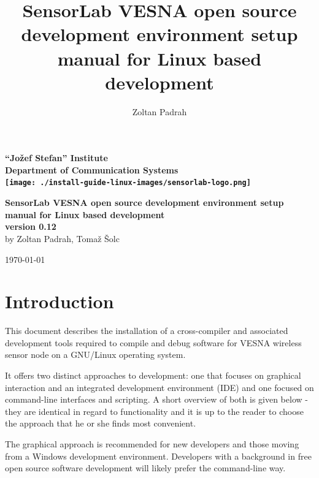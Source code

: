 \documentclass[a4paper, 10pt]{article}
\title{SensorLab VESNA open source development environment setup manual for Linux based development}
\author{Zoltan Padrah}
\begin{document}
\begin{titlepage}
    \begin{center}
    \textbf{
        \Large ``Jožef Stefan'' Institute \\[2mm]
        Department of Communication Systems\\[2mm]
        \texttt{[image: ./install-guide-linux-images/sensorlab-logo.png]}
        }\\

    \vfill

    \textbf{\huge SensorLab VESNA open source development environment setup manual
        for Linux based development}\\[1.5cm]


    \textbf{ \Large
    version 0.12}\\[1cm]

    \textnormal{\Large
    by Zoltan Padrah, Tomaž Šolc}\\[1cm]

    \vfill

    \textnormal{\large
    \today\\[1cm]
    }
    \end{center}
\end{titlepage}


\section{Introduction}

This document describes the installation of a cross-compiler and associated
development tools required to compile and debug software for VESNA wireless
sensor node on a GNU/Linux operating system.

It offers two distinct approaches to development: one that focuses on graphical
interaction and an integrated development environment (IDE) and one focused on
command-line interfaces and scripting. A short overview of both is given below
- they are identical in regard to functionality and it is up to the reader to
choose the approach that he or she finds most convenient.

The graphical approach is recommended for new developers and those moving from a
Windows development environment. Developers with a background in free open
source software development will likely prefer the command-line way.
\end{document}

